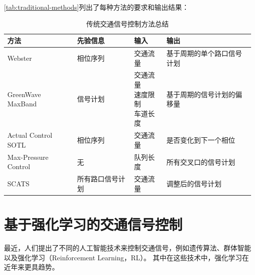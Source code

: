 \autoref{tab:traditional-methods}列出了每种方法的要求和输出结果：
\begin{table}[htb]
    \caption{传统交通信号控制方法总结\label{tab:traditional-methods}}
    \begin{tabular}{llll}
      \toprule
      方法 & 先验信息 & 输入 & 输出 \\
      \midrule
      Webster & 相位序列 & 交通流量 & 基于周期的单个路口信号计划 \\
      \hline
      \tabincell{l}{GreenWave\\MaxBand} & 信号计划 & \tabincell{l}{交通流量\\速度限制\\车道长度} & 基于周期的信号计划的偏移量 \\
      \hline
      \tabincell{l}{Actual Control\\SOTL} & 相位序列& 交通流量 & 是否变化到下一个相位\\
      \hline
      Max-Pressure Control & 无 & 队列长度 & 所有交叉口的信号计划\\
      \hline
      SCATS & 所有路口信号计划 & 交通流量 & 调整后的信号计划\\
      \bottomrule
    \end{tabular}
\end{table}

\section{基于强化学习的交通信号控制}
最近，人们提出了不同的人工智能技术来控制交通信号，例如遗传算法、群体智能以及强化学习（Reinforcement Learning，RL）。 其中在这些技术中，强化学习在近年来更具趋势。
